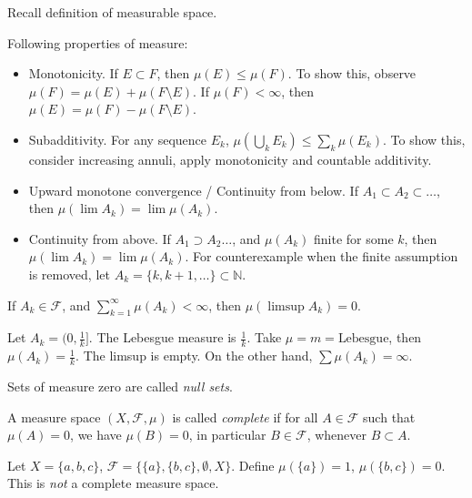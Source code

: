 
Recall definition of measurable space.

\begin{proposition}
	Following properties of measure:
	\begin{itemize}
		\item Monotonicity. If $E \subset F$, then $\mu(E) \le \mu(F)$. To show this, observe $\mu(F) = \mu(E) + \mu(F \setminus E)$. If $\mu(F) < \infty $, then $\mu(E) = \mu(F) - \mu(F \setminus E)$.

		\item Subadditivity. For any sequence  $E_k$, $\mu\left( \bigcup_{k} E_k \right)  \le  \sum_{k} \mu(E_k)$. To show this, consider increasing annuli, apply monotonicity and countable additivity.

		\item Upward monotone convergence / Continuity from below. If $A_1 \subset A_2 \subset \ldots$, then $\mu\left( \lim A_k \right)  = \lim \mu(A_k)$.
		\item Continuity from above. If $A_1\supset A_2 \ldots$, and $\mu(A_k)$ finite for some $k$, then $\mu(\lim A_k) = \lim \mu(A_k)$. For counterexample when the finite assumption is removed, let $A_k = \{k, k+1, \ldots\} \subset \mathbb{N}$.
	\end{itemize}
\end{proposition}

\begin{lemma}
	\label{lem:BorelCantelliLem}
	If $A_k \in \mathcal{F}$, and $\sum_{k = 1}^\infty \mu(A_k) < \infty $, then $\mu\left(\limsup A_k\right) = 0$.
\end{lemma}

\begin{example}
	Let $A_k = (0,\frac{1}{k}]$. The Lebesgue measure is $\frac{1}{k}$. Take $\mu = m = \text{Lebesgue}$, then $\mu(A_k) = \frac{1}{k}$. The limsup is empty. On the other hand, $\sum \mu(A_k) = \infty $.
\end{example}

\begin{definition}
	\label{defn:NullSets}
	Sets of measure zero are called \textit{null sets}.
\end{definition}

\begin{definition}
	\label{defn:CompleteMeasureSpace}
	A measure space $(X, \mathcal{F}, \mu)$ is called \textit{complete} if for all $A \in \mathcal{F}$ such that $\mu(A) = 0$, we have $\mu(B) = 0$, in particular $B \in \mathcal{F}$, whenever $B \subset A$.
\end{definition}

\begin{example}
	Let $X = \{a,b,c\} $, $\mathcal{F} = \{\{a\} ,\{b, c\} ,\emptyset , X\} $. Define $\mu(\{a\} ) = 1$, $\mu(\{b, c\} ) = 0$. This is \textit{not} a complete measure space.
\end{example}
